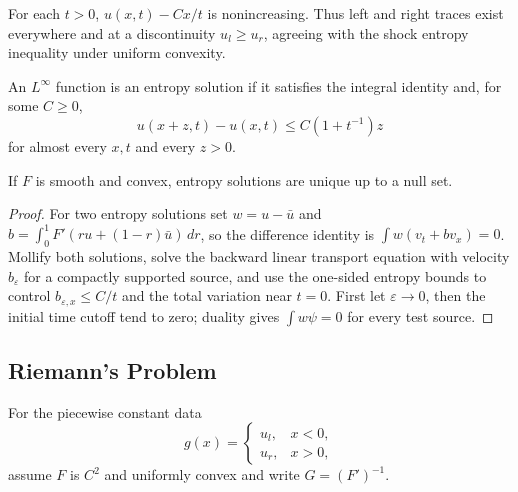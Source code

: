 \begin{remark}
\label{rem:entropy-condition-consequences}

For each $t>0$, $u(x,t)-Cx/t$ is nonincreasing. Thus left and right traces
exist everywhere and at a discontinuity $u_l\ge u_r$, agreeing with the shock
entropy inequality under uniform convexity.
\end{remark}

\begin{definition}
\label{def:entropy-solution-conservation-law}

An $L^\infty$ function is an entropy solution if it satisfies the integral
identity and, for some $C\ge0$,
\[
u(x+z,t)-u(x,t)\le C(1+t^{-1})z
\]
for almost every $x,t$ and every $z>0$.
\end{definition}

\begin{theorem}
\label{thm:uniqueness-entropy-solutions}

If $F$ is smooth and convex, entropy solutions are unique up to a null set.
\end{theorem}

\begin{proof}
\sketch For two entropy solutions set $w=u-\bar u$ and
$b=\int_0^1F'(ru+(1-r)\bar u)\,dr$, so the difference identity is
$\int w(v_t+bv_x)=0$. Mollify both solutions, solve the backward linear
transport equation with velocity $b_\varepsilon$ for a compactly supported
source, and use the one-sided entropy bounds to control
$b_{\varepsilon,x}\le C/t$ and the total variation near $t=0$. First let
$\varepsilon\to0$, then the initial time cutoff tend to zero; duality gives
$\int w\psi=0$ for every test source.
\end{proof}

\subsection{Riemann's Problem}
\label{sec:riemann-problem}

For the piecewise constant data
\[
g(x)=\begin{cases}u_l,&x<0,\\u_r,&x>0,\end{cases}
\]
assume $F$ is $C^2$ and uniformly convex and write $G=(F')^{-1}$.


